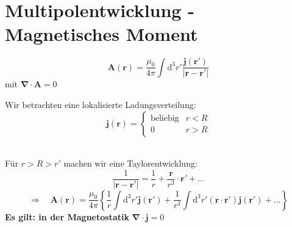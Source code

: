 \documentclass[titlepage,11pt,a4paper,ngerman]{report}
\newcommand{\tx}[1]{\textrm{#1}}
\newcommand{\dd}{\tx{d}}
\newcommand{\casess}[4]{\left\{ \begin{array}{ll} {#1} & {#2} \\ {#3} & {#4} \end{array} \right.}
\renewcommand{\vec}[1]{\boldsymbol{#1}}
\newcommand{\vabla}{\boldsymbol{\nabla}}
\begin{document}
\section{Multipolentwicklung - Magnetisches Moment}

\begin{equation*}
\vec{A}(\vec{r}) = \frac{\mu_0}{4 \pi} \int \dd ^3 r' \frac{\vec{j}(\vec{r}')}{|\vec{r} - \vec{r}'|}
\end{equation*}
mit $ \vabla \cdot \vec{A} = 0 $\\
\begin{minipage}{.5\linewidth}
	Wir betrachten eine lokalisierte Ladungsverteilung:
	\begin{equation*}
	\vec{j}(\vec{r}) = \casess{\tx{beliebig}}{r < R}{0}{r > R}
	\end{equation*}
\end{minipage}%
\begin{minipage}{.5\linewidth}
	\flushright
\end{minipage}%
\\
Für $ r > R > r' $ machen wir eine Taylorentwicklung:
\begin{equation*}
\frac{1}{|\vec{r} - \vec{r}'|} = \frac{1}{r} + \frac{\vec{r}}{r^3} \cdot \vec{r}' + \dots
\end{equation*}
\begin{equation*}
\Rightarrow \quad \vec{A}(\vec{r}) = \frac{\mu_0}{4 \pi} \left\{\frac{1}{r} \int \dd^3r' \vec{j} (\vec{r}') + \frac{1}{r^3} \int \dd ^3 r' (\vec{r} \cdot \vec{r}') \vec{j}(\vec{r}') + \dots \right\}
\end{equation*}
\textbf{Es gilt: in der Magnetostatik} $ \vabla \cdot \vec{j} = 0 $
\end{document}
